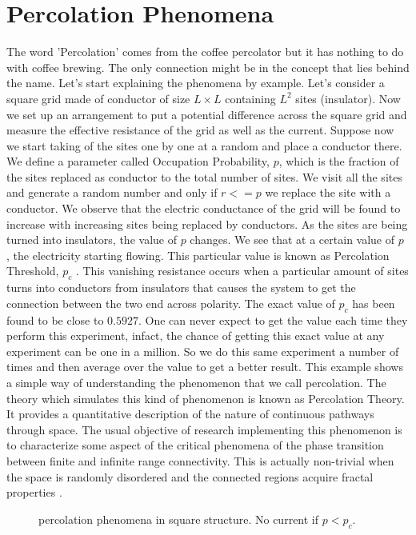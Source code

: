\section{Percolation Phenomena}
	The word 'Percolation' comes from the coffee percolator but it has nothing to do with	coffee brewing. The only connection might be in the concept that lies behind the name.	Let's start explaining the phenomena by example. Let's consider a square grid made of conductor of	size $L\times L$ containing $L^2$ sites (insulator).%
    Now we set up an arrangement to put a potential difference across the square grid and measure the effective resistance of the grid as well	as the current. Suppose now we start taking of the sites one by one at a random and place a conductor there. We	define a parameter called Occupation Probability, $p$, which is the fraction of the  sites replaced as conductor to the total number of sites. We visit all the sites and generate a random number and only if $r <= p$ we replace the site with a conductor. We observe that the electric	conductance of the grid will be found to increase with increasing sites being replaced by conductors. As the sites are being turned into insulators, the value of $p$ changes. We see that at a	certain value of $p$ , the electricity starting flowing. This particular value is known as Percolation Threshold, $p_c$ . This vanishing resistance occurs when a particular amount of sites turns into conductors from insulators that causes the system to get the connection	between the two end across polarity. The exact value of $p_c$ has been found to be close to $0.5927$. One can never expect to get the	value each time they perform this experiment, infact, the chance of getting this exact	value at any experiment can be one in a million. So we do this same experiment a	number of times and then average over the value to get a better result. This example shows a simple way of understanding the phenomenon that we call
	percolation. The theory which simulates this kind of phenomenon is known as Percolation Theory. It provides a quantitative description of the nature of continuous pathways through space. The usual objective of research implementing this phenomenon	is to characterize some aspect of the critical phenomena of the phase transition between finite and infinite range connectivity. This is actually non-trivial when the space	is randomly disordered and the connected regions acquire fractal properties \cite{Zimm1949, Mandelbrot1983}.
	\begin{figure}
		\centering
		\caption{percolation phenomena in square structure. No current if $p<p_c$.}
	\end{figure}

